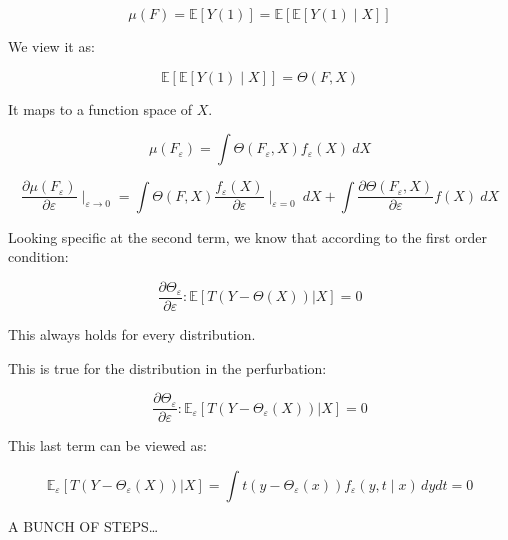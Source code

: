 \documentclass{article}
\begin{document}
$$
\mu(F) = \mathbb{E}[Y(1)] = \mathbb{E}[\mathbb{E}[Y(1) \mid X]]
$$

We view it as:

$$
\mathbb{E}[\mathbb{E}[Y(1) \mid X]] = \Theta(F, X)
$$

It maps to a function space of $X$.

$$
\mu(F_{\varepsilon}) = \int \Theta(F_{\varepsilon}, X) f_{\varepsilon}(X) \ dX
$$

$$
\frac{\partial \mu (F_{\varepsilon})}{\partial \varepsilon} \mid_{\varepsilon \to 0}
=
\int \Theta(F, X) \frac{f_{\varepsilon}(X)}{\partial \varepsilon} \mid_{\varepsilon = 0} \ dX
+ 
\int \frac{\partial \Theta(F_{\varepsilon}, X)}{\partial \varepsilon} f(X) \ dX
$$

Looking specific at the second term, we know that according to the first order condition:

$$
\frac{\partial \Theta_{\varepsilon}}{\partial \varepsilon}:
\mathbb{E}[T(Y - \Theta(X)) | X] = 0
$$

This always holds for every distribution.

This is true for the distribution in the perfurbation:

$$
\frac{\partial \Theta_{\varepsilon}}{\partial \varepsilon}:
\mathbb{E}_{\varepsilon}[T(Y - \Theta_{\varepsilon}(X)) | X] = 0
$$

This last term can be viewed as:

$$
\mathbb{E}_{\varepsilon}[T(Y - \Theta_{\varepsilon}(X)) | X] =
\int t (y - \Theta_{\varepsilon}(x)) f_{\varepsilon} (y, t \mid x) \, dy dt = 0
$$

A BUNCH OF STEPS\dots
\end{document}
